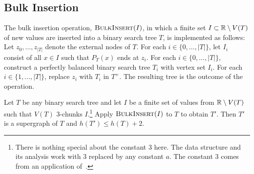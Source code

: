 \documentclass[10pt, conference, compsocconf]{IEEEtran}
\let\le\leqslant
\begin{document}


\subsection{Bulk Insertion}

The bulk insertion operation, $\textsc{BulkInsert}(I)$,
in which a finite set $I\subset  \mathbb{R}\setminus V(T)$ of new values are inserted into a binary search tree $T$, is implemented as follows: Let $z_0,\dots,z_{|T|}$ denote the external nodes of $T$.  For each $i\in\{0,\dots,|T|\}$, let $I_i$ consist of all $x\in I$ such that $P_T(x)$ ends at $z_i$.
For each $i\in\{0,\dots,|T|\}$, construct a perfectly balanced binary search tree $T_i$ with vertex set $I_i$.
For each $i\in\{1,\dots,|T|\}$, replace $z_i$ with $T_i$ in $T^+$.
The resulting tree is the outcome of the operation.

\begin{lem}
  Let $T$ be any binary search tree and let $I$ be a finite set of values from $\mathbb{R}\setminus V(T)$ such that
  $V(T)$ $3$-chunks $I$.\footnote{There is nothing special about the constant $3$ here.  The data structure and its analysis work with $3$ replaced by any constant $a$. The constant $3$ comes from an application of~.}
  Apply $\textsc{BulkInsert}(I)$ to $T$ to obtain $T'$.
  Then $T'$ is a supergraph of $T$ and $h(T')\le h(T)+2$.
\end{lem}
\end{document}
